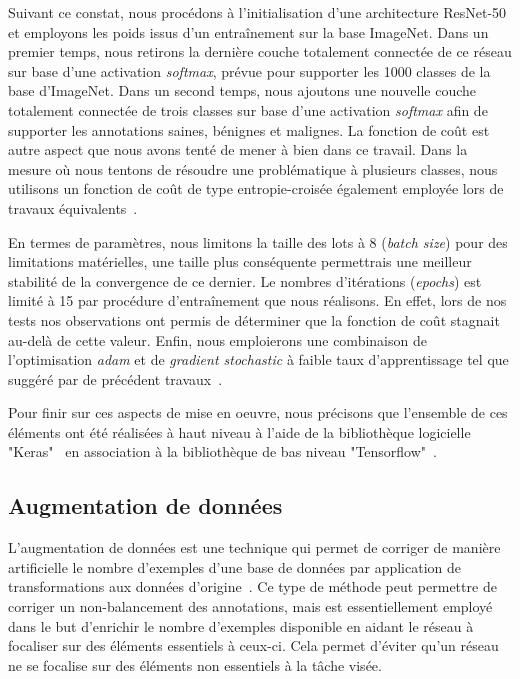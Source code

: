 Suivant ce constat, nous procédons à l'initialisation d'une architecture ResNet-50 et employons les poids issus d'un entraînement sur la base ImageNet. Dans un premier temps, nous retirons la dernière couche totalement connectée de ce réseau sur base d'une activation \textit{softmax}, prévue pour supporter les 1000 classes de la base d'ImageNet. Dans un second temps, nous ajoutons une nouvelle couche totalement connectée de trois classes sur base d'une activation \textit{softmax} afin de supporter les annotations saines, bénignes et malignes. La fonction de coût est autre aspect que nous avons tenté de mener à bien dans ce travail. Dans la mesure où nous tentons de résoudre une problématique à plusieurs classes, nous utilisons un fonction de coût de type entropie-croisée également employée lors de travaux équivalents~\cite{Barbu2018,Park2019}.\par

En termes de paramètres, nous limitons la taille des lots à 8 (\textit{batch size}) pour des limitations matérielles, une taille plus conséquente permettrais une meilleur stabilité de la convergence de ce dernier. Le nombres d'itérations (\textit{epochs}) est limité à 15 par procédure d'entraînement que nous réalisons. En effet, lors de nos tests nos observations ont permis de déterminer que la fonction de coût stagnait au-delà de cette valeur. Enfin, nous emploierons une combinaison de l'optimisation \textit{adam} et de \textit{gradient stochastic} à faible taux d'apprentissage tel que suggéré par de précédent travaux~\cite{Barbu2018,Park2019}.\par

Pour finir sur ces aspects de mise en oeuvre, nous précisons que l'ensemble de ces éléments ont été réalisées à haut niveau à l'aide de la bibliothèque logicielle "Keras"~\cite{chollet2015} en association à la bibliothèque de bas niveau "Tensorflow"~\cite{tensorflow2015}.\par

\subsection{Augmentation de données}
L'augmentation de données est une technique qui permet de corriger de manière artificielle le nombre d'exemples d'une base de données par application de transformations aux données d'origine~\cite{Wong2016,Taylor2018}. Ce type de méthode peut permettre de corriger un non-balancement des annotations, mais est essentiellement employé dans le but d'enrichir le nombre d'exemples disponible en aidant le réseau à focaliser sur des éléments essentiels à ceux-ci. Cela permet d'éviter qu'un réseau ne se focalise sur des éléments non essentiels à la tâche visée.\par

